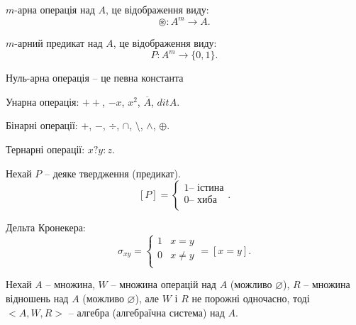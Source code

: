 \begin{definition}
    $m$-арна операція над $A$, це відображення виду:
    $$\circledast: A^m \rightarrow A.$$
\end{definition}

\begin{definition}
    $m$-арний предикат над $A$, це відображення виду:
    $$P: A^m \rightarrow \{0, 1\}.$$
\end{definition}


\begin{example}
    Нуль-арна операція -- це певна константа
\end{example}

\begin{example}
    Унарна операція: $++$, $-x$, $x^2$, $\overline{A}$, $dit A$.
\end{example}

\begin{example}
    Бінарні операції: $+$, $-$, $\div$, $\cap$, $\setminus$, $\wedge$, $\oplus$.
\end{example}

\begin{example}
    Тернарні операції: $x?y:z$.
\end{example}

\begin{example}
    Нехай $P$ -- деяке твердження (предикат).
    $$[P] = \left\{ \begin{array}{l}
        1 \text{-- істина} \\
        0 \text{-- хиба} \\
    \end{array} \right. .$$
\end{example}


\begin{example}
    Дельта Кронекера:
    $$\sigma_{xy} = \left\{ \begin{array}{ll}
        1 & x = y  \\
        0 & x \neq y \\
    \end{array} \right. = [x = y].$$
\end{example}


\begin{definition}
    Нехай $A$ -- множина,
    $W$ -- множина операцій над $A$ (можливо $\varnothing$),
    $R$ -- множина відношень над $A$ (можливо $\varnothing$),
    але $W$ і $R$ не порожні одночасно, тоді
    $<A, W, R>$ -- алгебра (алгебраїчна система) над $A$.
\end{definition}

